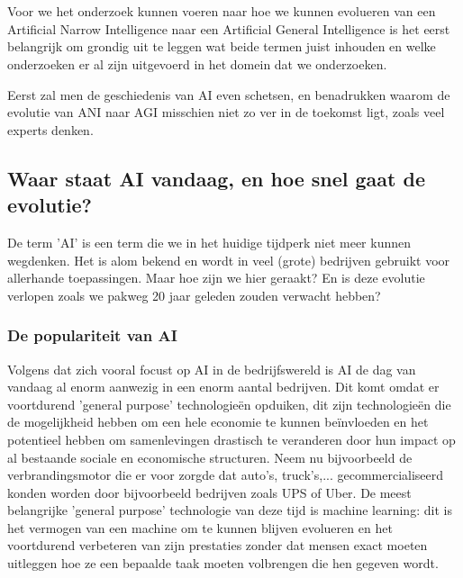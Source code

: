 \chapter{}
\label{ch:stand-van-zaken}



Voor we het onderzoek kunnen voeren naar hoe we kunnen evolueren van een Artificial Narrow Intelligence naar een Artificial General Intelligence is het eerst belangrijk om grondig uit te leggen wat beide termen juist inhouden en welke onderzoeken er al zijn uitgevoerd in het domein dat we onderzoeken.

Eerst zal men de geschiedenis van AI even schetsen, en benadrukken waarom de evolutie van ANI naar AGI misschien niet zo ver in de toekomst ligt, zoals veel experts denken.

\section{Waar staat AI vandaag, en hoe snel gaat de evolutie?}
De term 'AI' is een term die we in het huidige tijdperk niet meer kunnen wegdenken. Het is alom bekend en wordt in veel (grote) bedrijven gebruikt voor allerhande toepassingen. Maar hoe zijn we hier geraakt? En is deze evolutie verlopen zoals we pakweg 20 jaar geleden zouden verwacht hebben?

\subsection{De populariteit van AI}
Volgens \cite{brynjolfsson2017artificial} dat zich vooral focust op AI in de bedrijfswereld is AI de dag van vandaag al enorm aanwezig in een enorm aantal bedrijven. Dit komt omdat er voortdurend 'general purpose' technologieën opduiken, dit zijn technologieën die de mogelijkheid hebben om een hele economie te kunnen beïnvloeden en het potentieel hebben om samenlevingen drastisch te veranderen door hun impact op al bestaande sociale en economische structuren. Neem nu bijvoorbeeld de verbrandingsmotor die er voor zorgde dat auto's, truck's,... gecommercialiseerd konden worden door bijvoorbeeld bedrijven zoals UPS of Uber. De meest belangrijke 'general purpose' technologie van deze tijd is machine learning: dit is het vermogen van een machine om te kunnen blijven evolueren en het voortdurend verbeteren van zijn prestaties zonder dat mensen exact moeten uitleggen hoe ze een bepaalde taak moeten volbrengen die hen gegeven wordt. 

